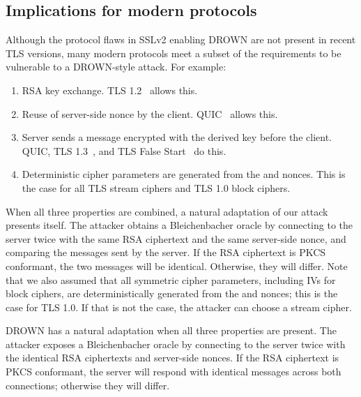 \subsection{Implications for modern protocols}
Although the protocol flaws in SSLv2 enabling DROWN are not present in recent TLS versions, many modern protocols meet a subset of the requirements to be vulnerable to a DROWN-style attack. For example:
\begin{enumerate}
	\item RSA key exchange. TLS 1.2~\cite{rfc5246} allows this.
	\item Reuse of server-side nonce by the client. QUIC~\cite{quic-langley-2014} allows this.
	\item Server sends a message encrypted with the derived key before the client. QUIC, TLS 1.3~\cite{rfc8446}, and TLS False Start~\cite{rfc7918} do this.
	\item Deterministic cipher parameters are generated from the \pms and nonces. This is the case for all TLS stream ciphers and TLS 1.0 block ciphers.
\end{enumerate}

When all three properties are combined, a natural adaptation of our attack presents itself.
The attacker obtains a Bleichenbacher oracle by connecting to the server twice with the same RSA ciphertext and the same server-side nonce, and comparing the messages sent by the server.
If the RSA ciphertext is PKCS conformant, the two messages will be identical.
Otherwise, they will differ.
Note that we also assumed that all symmetric cipher parameters, including IVs for block ciphers, are deterministically generated from the \pms and nonces; this is the case for TLS 1.0.
If that is not the case, the attacker can choose a stream cipher.
\fi

DROWN has a natural adaptation when all three properties are present. The attacker exposes a Bleichenbacher oracle by connecting to the server twice with the identical RSA ciphertexts and server-side nonces. If the RSA ciphertext is PKCS conformant, the server will respond with identical messages across both connections; otherwise they will differ.


